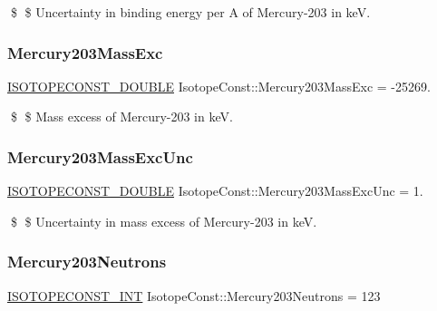 \$ \$ Uncertainty in binding energy per A of Mercury-\/203 in keV. \mbox{\label{group___isotope_const-_mercury-_hg203_ga925712a549513a3954c8bddb649483d9}} 
\subsubsection{\texorpdfstring{Mercury203\+Mass\+Exc}{Mercury203MassExc}}
{\footnotesize\ttfamily \mbox{\hyperlink{group___isotope_const-_macros_ga8f45a7272ce02c0b4c65c44636ed719a}{I\+S\+O\+T\+O\+P\+E\+C\+O\+N\+S\+T\+\_\+\+D\+O\+U\+B\+LE}} Isotope\+Const\+::\+Mercury203\+Mass\+Exc = -\/25269.}

\$ \$ Mass excess of Mercury-\/203 in keV. \mbox{\label{group___isotope_const-_mercury-_hg203_ga912a3d615681bf330e31f18c750eeb9d}} 
\subsubsection{\texorpdfstring{Mercury203\+Mass\+Exc\+Unc}{Mercury203MassExcUnc}}
{\footnotesize\ttfamily \mbox{\hyperlink{group___isotope_const-_macros_ga8f45a7272ce02c0b4c65c44636ed719a}{I\+S\+O\+T\+O\+P\+E\+C\+O\+N\+S\+T\+\_\+\+D\+O\+U\+B\+LE}} Isotope\+Const\+::\+Mercury203\+Mass\+Exc\+Unc = 1.}

\$ \$ Uncertainty in mass excess of Mercury-\/203 in keV. \mbox{\label{group___isotope_const-_mercury-_hg203_ga19fbdf64712722b4519cfa368f488b69}} 
\subsubsection{\texorpdfstring{Mercury203\+Neutrons}{Mercury203Neutrons}}
{\footnotesize\ttfamily \mbox{\hyperlink{group___isotope_const-_macros_ga5f18360b3e99483a35c32d789e62621c}{I\+S\+O\+T\+O\+P\+E\+C\+O\+N\+S\+T\+\_\+\+I\+NT}} Isotope\+Const\+::\+Mercury203\+Neutrons = 123}

